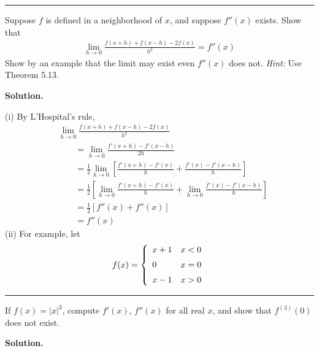 \documentclass[12pt]{article}
\theoremstyle{definition}
\begin{document}
\bigskip\noindent\hrule\bigskip

Suppose $f$ is defined in a neighborhood of $x$, and suppose $f''(x)$ exists. Show that
\begin{align*}
\lim_{h\to 0}\frac{f(x+h)+f(x-h)-2f(x)}{h^2}=f''(x)
\end{align*}
Show by an example that the limit may exist even $f''(x)$ does not.
\textit{Hint:} Use Theorem 5.13.

\smallskip
\noindent\textbf{Solution.}\quad

(i) By L'Hospital's rule,
\begin{align*}
&\lim_{h\to 0}\frac{f(x+h)+f(x-h)-2f(x)}{h^2} \\
&\qquad=\lim_{h\to 0}\frac{f'(x+h)-f'(x-h)}{2h}\\
&\qquad=\frac{1}{2}\lim_{h\to 0}\left[\frac{f'(x+h)-f'(x)}{h}+\frac{f'(x)-f'(x-h)}{h}\right] \\
&\qquad=\frac{1}{2}\left[\lim_{h\to 0}\frac{f'(x+h)-f'(x)}{h}+\lim_{h\to 0}\frac{f'(x)-f'(x-h)}{h}\right] \\
&\qquad=\frac{1}{2}\left[f''(x)+f''(x)\right] \\
&\qquad=f''(x)
\end{align*}
(ii) For example, let
\begin{align*}
f(x)=\left\{\begin{array}{ll}
x+1&x<0 \vspace{0.08in}\\
0&x=0 \vspace{0.08in}\\
x-1&x>0
\end{array}\right.
\end{align*}



\bigskip\noindent\hrule\bigskip

If $f(x)=\left\vert x\right\vert^3$, compute $f'(x)$, $f''(x)$ for all real $x$, and show that $f^{(3)}(0)$ does not exist.

\smallskip
\noindent\textbf{Solution.}\quad
\end{document}
